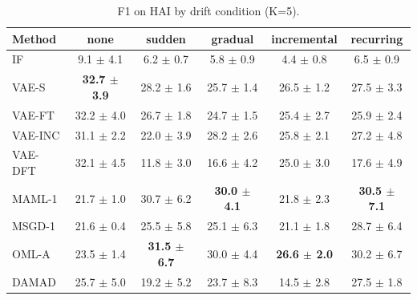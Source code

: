 \begin{table}[t]
\centering
\small
\caption{F1 on HAI by drift condition (K=5).}
\label{tab:drift_f1_hai}
\begin{tabular}{lccccc}
\toprule
Method & none & sudden & gradual & incremental & recurring \\
\midrule
IF & 9.1 $\pm$ 4.1 & 6.2 $\pm$ 0.7 & 5.8 $\pm$ 0.9 & 4.4 $\pm$ 0.8 & 6.5 $\pm$ 0.9 \\
VAE-S & \textbf{32.7 $\pm$ 3.9} & 28.2 $\pm$ 1.6 & 25.7 $\pm$ 1.4 & 26.5 $\pm$ 1.2 & 27.5 $\pm$ 3.3 \\
VAE-FT & 32.2 $\pm$ 4.0 & 26.7 $\pm$ 1.8 & 24.7 $\pm$ 1.5 & 25.4 $\pm$ 2.7 & 25.9 $\pm$ 2.4 \\
VAE-INC & 31.1 $\pm$ 2.2 & 22.0 $\pm$ 3.9 & 28.2 $\pm$ 2.6 & 25.8 $\pm$ 2.1 & 27.2 $\pm$ 4.8 \\
VAE-DFT & 32.1 $\pm$ 4.5 & 11.8 $\pm$ 3.0 & 16.6 $\pm$ 4.2 & 25.0 $\pm$ 3.0 & 17.6 $\pm$ 4.9 \\
MAML-1 & 21.7 $\pm$ 1.0 & 30.7 $\pm$ 6.2 & \textbf{30.0 $\pm$ 4.1} & 21.8 $\pm$ 2.3 & \textbf{30.5 $\pm$ 7.1} \\
MSGD-1 & 21.6 $\pm$ 0.4 & 25.5 $\pm$ 5.8 & 25.1 $\pm$ 6.3 & 21.1 $\pm$ 1.8 & 28.7 $\pm$ 6.4 \\
OML-A & 23.5 $\pm$ 1.4 & \textbf{31.5 $\pm$ 6.7} & 30.0 $\pm$ 4.4 & \textbf{26.6 $\pm$ 2.0} & 30.2 $\pm$ 6.7 \\
DAMAD & 25.7 $\pm$ 5.0 & 19.2 $\pm$ 5.2 & 23.7 $\pm$ 8.3 & 14.5 $\pm$ 2.8 & 27.5 $\pm$ 1.8 \\
\bottomrule
\end{tabular}
\end{table}

